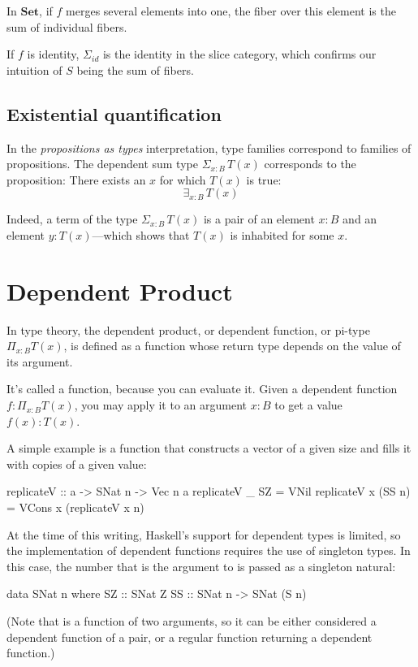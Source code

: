 \documentclass[DaoFP]{subfiles}
\begin{document}
In $\mathbf{Set}$, if $f$ merges several elements into one, the fiber over this element is the sum of individual fibers. 

If $f$ is identity, $\Sigma_{\mathit{id}}$ is the identity in the slice category, which confirms our intuition of $S$ being the sum of fibers.

\subsection{Existential quantification}

In the \emph{propositions as types} interpretation, type families correspond to families of propositions. The dependent sum type $\Sigma_{x : B} \, T(x)$ corresponds to the proposition: There exists an $x$ for which $T(x)$ is true:
\[ \exists_{x : B} \, T (x)\]

Indeed, a term of the type $\Sigma_{x : B} \, T(x)$ is a pair of an element $x \colon B$ and an element $y \colon T(x)$---which shows that $T(x)$ is inhabited for some $x$.

\section{Dependent Product}

In type theory, the dependent product, or dependent function, or pi-type $\Pi_{x:B} T(x)$, is defined as a function whose return type depends on the value of its argument. 

It's called a function, because you can evaluate it. Given a dependent function  $f \colon \Pi_{x:B} T(x)$, you may apply it to an argument $x\colon B$ to get a value $f(x) \colon T(x)$.

A simple example is a function that constructs a vector of a given size and fills it with copies of a given value:
\begin{haskell}
replicateV :: a -> SNat n -> Vec n a
replicateV _ SZ  = VNil
replicateV x (SS n) = VCons x (replicateV x n)
\end{haskell}

At the time of this writing, Haskell's support for dependent types is limited, so the implementation of dependent functions requires the use of singleton types. In this case, the number that is the argument to  is passed as a singleton natural:
\begin{haskell}
data SNat n where
  SZ :: SNat Z
  SS :: SNat n -> SNat (S n)
\end{haskell}
(Note that  is a function of two arguments, so it can be either considered a dependent function of a pair, or a regular function returning a dependent function.)
\end{document}
